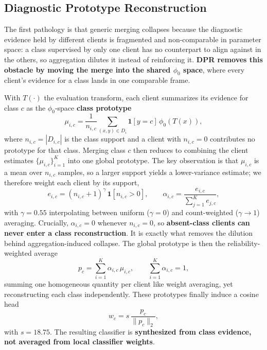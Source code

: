\documentclass[letterpaper]{article} %
\begin{document}
\subsection{Diagnostic Prototype Reconstruction}

The first pathology is that generic merging collapses because the diagnostic evidence held by different clients is fragmented and non-comparable in parameter space: a class supervised by only one client has no counterpart to align against in the others, so aggregation dilutes it instead of reinforcing it. \textbf{DPR removes this obstacle by moving the merge into the shared $\phi_0$ space}, where every client's evidence for a class lands in one comparable frame.

With $T(\cdot)$ the evaluation transform, each client summarizes its evidence for class $c$ as the $\phi_0$-space \textbf{class prototype}
\begin{equation}
\mu_{i,c}=\frac{1}{n_{i,c}}\sum_{(x,y)\in D_i}\mathbf{1}[y=c]\,\phi_0(T(x)),
\end{equation}
where $n_{i,c}=|D_{i,c}|$ is the class support and a client with $n_{i,c}=0$ contributes no prototype for that class. Merging class $c$ then reduces to combining the client estimates $\{\mu_{i,c}\}_{i=1}^{K}$ into one global prototype. The key observation is that $\mu_{i,c}$ is a mean over $n_{i,c}$ samples, so a larger support yields a lower-variance estimate; we therefore weight each client by its support,
\begin{equation}
e_{i,c}=(n_{i,c}+1)^{\gamma}\,\mathbf{1}[n_{i,c}>0],\qquad
\alpha_{i,c}=\frac{e_{i,c}}{\sum_{j=1}^{K} e_{j,c}},
\end{equation}
with $\gamma=0.55$ interpolating between uniform ($\gamma=0$) and count-weighted ($\gamma\!\to\!1$) averaging. Crucially, $\alpha_{i,c}=0$ whenever $n_{i,c}=0$, so \textbf{absent-class clients can never enter a class reconstruction}. It is exactly what removes the dilution behind aggregation-induced collapse. The global prototype is then the reliability-weighted average
\begin{equation}
p_c=\sum_{i=1}^{K}\alpha_{i,c}\,\mu_{i,c},\qquad \sum_{i=1}^{K}\alpha_{i,c}=1,
\label{eq:dpr-fuse}
\end{equation}
summing one homogeneous quantity per client like weight averaging, yet reconstructing each class independently. These prototypes finally induce a cosine head
\begin{equation}
w_c=s\,\frac{p_c}{\|p_c\|_2},
\end{equation}
with $s=18.75$. The resulting classifier is \textbf{synthesized from class evidence, not averaged from local classifier weights}.
\end{document}
